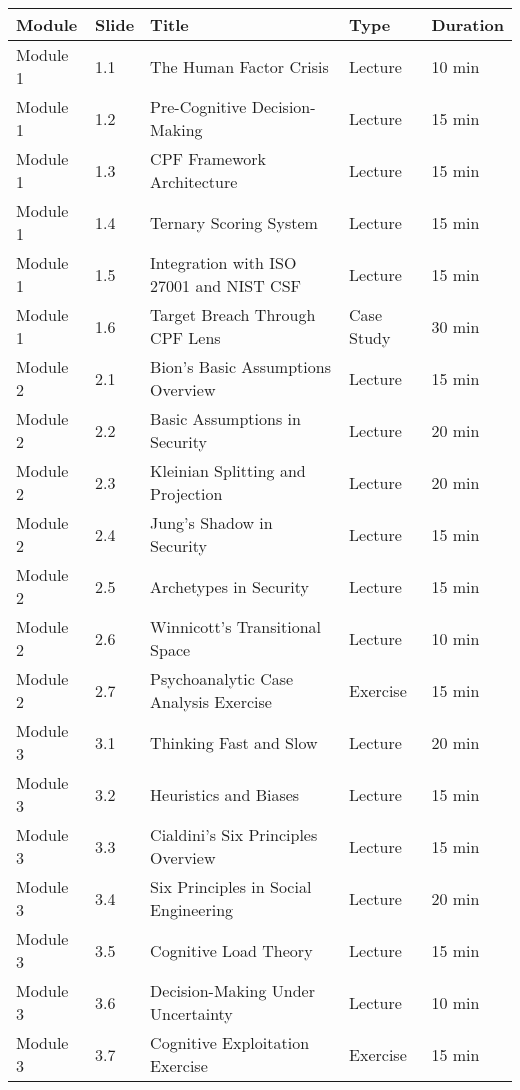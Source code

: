 \documentclass[11pt,a4paper]{article}
\begin{document}
\begin{longtable}{|p{2cm}|p{1cm}|p{7cm}|p{2cm}|p{1.5cm}|}
\hline
\textbf{Module} & \textbf{Slide} & \textbf{Title} & \textbf{Type} & \textbf{Duration} \\
\hline
\endhead

Module 1 & 1.1 & The Human Factor Crisis & Lecture & 10 min \\
Module 1 & 1.2 & Pre-Cognitive Decision-Making & Lecture & 15 min \\
Module 1 & 1.3 & CPF Framework Architecture & Lecture & 15 min \\
Module 1 & 1.4 & Ternary Scoring System & Lecture & 15 min \\
Module 1 & 1.5 & Integration with ISO 27001 and NIST CSF & Lecture & 15 min \\
Module 1 & 1.6 & Target Breach Through CPF Lens & Case Study & 30 min \\
\hline

Module 2 & 2.1 & Bion's Basic Assumptions Overview & Lecture & 15 min \\
Module 2 & 2.2 & Basic Assumptions in Security & Lecture & 20 min \\
Module 2 & 2.3 & Kleinian Splitting and Projection & Lecture & 20 min \\
Module 2 & 2.4 & Jung's Shadow in Security & Lecture & 15 min \\
Module 2 & 2.5 & Archetypes in Security & Lecture & 15 min \\
Module 2 & 2.6 & Winnicott's Transitional Space & Lecture & 10 min \\
Module 2 & 2.7 & Psychoanalytic Case Analysis Exercise & Exercise & 15 min \\
\hline

Module 3 & 3.1 & Thinking Fast and Slow & Lecture & 20 min \\
Module 3 & 3.2 & Heuristics and Biases & Lecture & 15 min \\
Module 3 & 3.3 & Cialdini's Six Principles Overview & Lecture & 15 min \\
Module 3 & 3.4 & Six Principles in Social Engineering & Lecture & 20 min \\
Module 3 & 3.5 & Cognitive Load Theory & Lecture & 15 min \\
Module 3 & 3.6 & Decision-Making Under Uncertainty & Lecture & 10 min \\
Module 3 & 3.7 & Cognitive Exploitation Exercise & Exercise & 15 min \\
\hline


\end{longtable}
\end{document}
